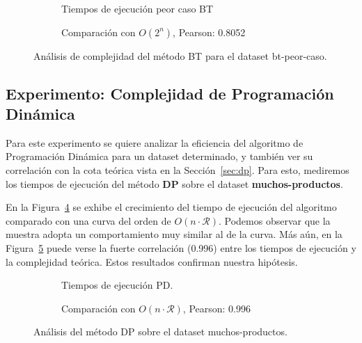 \documentclass{article}
\newcommand{\pd}{Programación Dinámica}
\newcommand{\Res}{\mathcal{R}}
\begin{document}
\begin{figure}[!ht]
    \centering
    \begin{subfigure}{0.45\textwidth}
        \centering
        
        \caption{Tiempos de ejecución peor caso BT}
        \label{fig:bt-complejidad-peor}
    \end{subfigure}
    \begin{subfigure}{0.45\textwidth}
        \centering
        
        \caption{Comparación con $O(2^{n})$, Pearson: 0.8052}
        \label{fig:bt-corr-peor}
    \end{subfigure}
    \caption{Análisis de complejidad del método BT para el dataset bt-peor-caso.}
    \label{fig:bt-complejidad-peor-caso}
\end{figure}

\subsection{Experimento: Complejidad de Programación Dinámica}
Para este experimento se quiere analizar la eficiencia del algoritmo de \pd{} para un dataset determinado, y también ver su correlación con la cota teórica vista en la Sección~\ref{sec:dp}. Para esto, mediremos los tiempos de ejecución del método \textbf{DP} sobre el dataset \textbf{muchos-productos}.

En la Figura~\ref{fig:dp} se exhibe el crecimiento del tiempo de ejecución del algoritmo comparado con una curva del orden de $O(n \cdot \Res)$. Podemos observar que la muestra adopta un comportamiento muy similar al de la curva. Más aún, en la Figura~\ref{fig:dp-corr} puede verse la fuerte correlación (0.996) entre los tiempos de ejecución y la complejidad teórica. Estos resultados confirman nuestra hipótesis.

\begin{figure}[!ht]
    \centering
    \begin{subfigure}[b]{0.45\textwidth}
        \centering
        
        \caption{Tiempos de ejecución PD.}
        \label{fig:dp}
    \end{subfigure}
    \begin{subfigure}[b]{0.45\textwidth}
        \centering
        
        \caption{Comparación con $O(n \cdot \Res)$, Pearson: 0.996}
        \label{fig:dp-corr}
    \end{subfigure}
    \caption{Análisis del método DP sobre el dataset muchos-productos.}
    \label{fig:dp-tiempos}
\end{figure}
\end{document}
